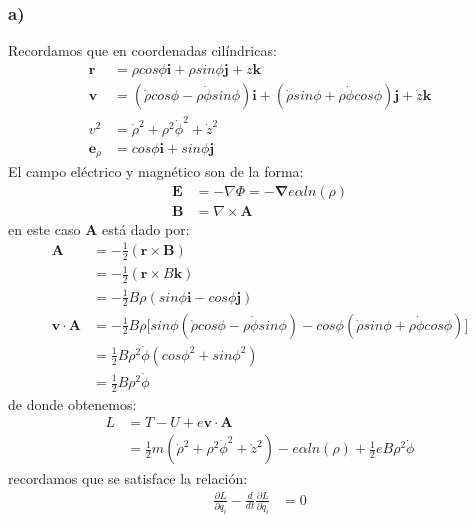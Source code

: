 \documentclass{article}
\begin{document}
\begin{tcolorbox}[breakable]
    \subsubsection*{a)}
    Recordamos que en coordenadas cilíndricas:
    \begin{align*}
        \bm{r} &= \rho cos\phi \bm{i} + \rho sin\phi\bm{j} + z\bm{k} \\
        \bm{v} 
        &=(\dot{\rho} cos\phi - \rho \dot{\phi}sin\phi) \bm{i} 
        + (\dot{\rho}sin\phi + \rho \dot{\phi}cos\phi) \bm{j} 
        + \dot{z}\bm{k} \\
        v^2 &= \dot{\rho}^2 + \rho^2\dot{\phi}^2 + \dot{z}^2 \\ 
        \bm{e}_\rho &= cos\phi \bm{i} + sin\phi \bm{j} 
    \end{align*}
    El campo eléctrico y magnético son de la forma:
    \begin{align*}
        \bm{E} &= -\nabla \Phi = -\bm{\nabla} e\alpha ln(\rho) \\ 
        \bm{B} &= \nabla \times \bm{A} 
    \end{align*}
    en este caso $\bm{A}$ está dado por:
    \begin{align*}
        \bm{A} 
        &= -\frac{1}{2}(\bm{r} \times \bm{B}) \\
        &= -\frac{1}{2}(\bm{r} \times B\bm{k}) \\
        &= -\frac{1}{2}B\rho(sin\phi \bm{i} - cos\phi \bm{j}) \\
        \bm{v} \cdot \bm{A} 
        &= -\frac{1}{2}B\rho 
        \bigg[ sin\phi (\dot{\rho} cos\phi - \rho \dot{\phi}sin\phi) 
        -cos\phi (\dot{\rho}sin\phi + \rho \dot{\phi}cos\phi) \bigg] \\
        &= \frac{1}{2}B\rho^2 \dot{\phi}(cos\phi^2 + sin\phi^2) \\
        &= \frac{1}{2}B\rho^2 \dot{\phi} 
    \end{align*}
    de donde obtenemos:
    \begin{align*}
        L 
        &= T - U + e\bm{v} \cdot \bm{A} \\
        &= \frac{1}{2}m(\dot{\rho}^2 + \rho^2\dot{\phi}^2 + \dot{z}^2) - e\alpha ln(\rho) + \frac{1}{2}eB\rho^2 \dot{\phi}
    \end{align*}
    recordamos que se satisface la relación:
    \begin{align*}
        \frac{\partial L}{\partial q_i} - \frac{d}{dt}\frac{\partial L}{\partial \dot{q}_i} &= 0

\end{align*}
\end{tcolorbox}
\end{document}

